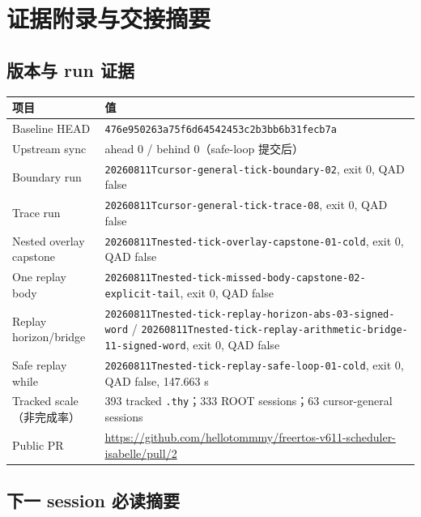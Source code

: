 \documentclass[11pt,a4paper,UTF8]{ctexart}
\newcommand{\code}[1]{\nolinkurl{#1}}
\begin{document}
\clearpage

\section{证据附录与交接摘要}

\small

\subsection{版本与 run 证据}

\noindent\begin{tabularx}{\textwidth}{p{38mm}Y}
\toprule
项目 & 值\\
\midrule
Baseline HEAD & \code{476e950263a75f6d64542453c2b3bb6b31fecb7a}\\
Upstream sync & ahead 0 / behind 0（safe-loop 提交后）\\
Boundary run & \code{20260811Tcursor-general-tick-boundary-02}, exit 0, QAD false\\
Trace run & \code{20260811Tcursor-general-tick-trace-08}, exit 0, QAD false\\
Nested overlay capstone & \code{20260811Tnested-tick-overlay-capstone-01-cold}, exit 0, QAD false\\
One replay body & \code{20260811Tnested-tick-missed-body-capstone-02-explicit-tail}, exit 0, QAD false\\
Replay horizon/bridge & \code{20260811Tnested-tick-replay-horizon-abs-03-signed-word} / \code{20260811Tnested-tick-replay-arithmetic-bridge-11-signed-word}, exit 0, QAD false\\
Safe replay while & \code{20260811Tnested-tick-replay-safe-loop-01-cold}, exit 0, QAD false, 147.663 s\\
Tracked scale（非完成率） & 393 tracked \code{.thy}；333 ROOT sessions；63 cursor-general sessions\\
Public PR & \url{https://github.com/hellotommmy/freertos-v611-scheduler-isabelle/pull/2}\\
\bottomrule
\end{tabularx}

\subsection{下一 session 必读摘要}
\end{document}
